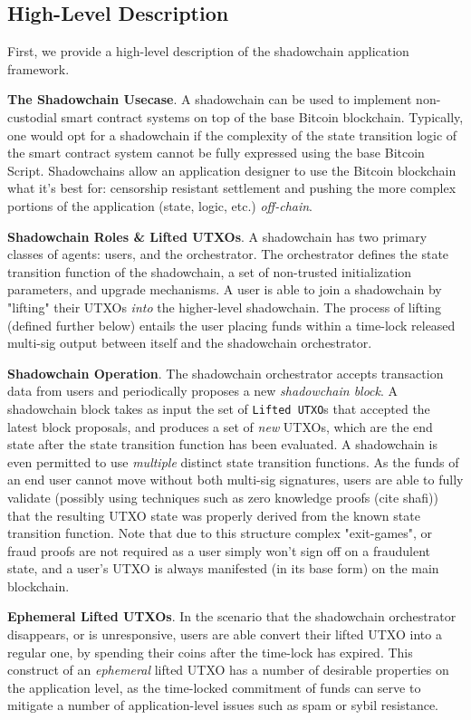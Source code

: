 \documentclass[10pt,a4paper]{article}
\theoremstyle{definition}
\begin{document}
\subsection{High-Level Description}

First, we provide a high-level description of the shadowchain application
framework.

\textbf{The Shadowchain Usecase}. A shadowchain can be used to implement
non-custodial smart contract systems on top of the base Bitcoin blockchain.
Typically, one would opt for a shadowchain if the complexity of the state
transition logic of the smart contract system cannot be fully expressed using
the base Bitcoin Script. Shadowchains allow an application designer to use the
Bitcoin blockchain what it's best for: censorship resistant settlement and
pushing the more complex portions of the application (state, logic, etc.)
\emph{off-chain}.

\textbf{Shadowchain Roles \& Lifted UTXOs}. A shadowchain has two primary
classes of agents: users, and the orchestrator.  The orchestrator defines the
state transition function of the shadowchain, a set of non-trusted
initialization parameters, and upgrade mechanisms. A user is able to join a
shadowchain by "lifting" their UTXOs \emph{into} the higher-level shadowchain.
The process of lifting (defined further below) entails the user placing funds
within a time-lock released multi-sig output between itself and the shadowchain
orchestrator.

\textbf{Shadowchain Operation}. The shadowchain orchestrator accepts
transaction data from users and periodically proposes a new \emph{shadowchain
block}. A shadowchain block takes as input the set of \texttt{Lifted UTXO}s
that accepted the latest block proposals, and produces a set of \emph{new}
UTXOs, which are the end state after the state transition function has been
evaluated. A shadowchain is even permitted to use \emph{multiple} distinct state
transition functions. As the funds of an end user cannot move without both
multi-sig signatures, users are able to fully validate (possibly using
techniques such as zero knowledge proofs (cite shafi)) that the
resulting UTXO state was properly derived from the known state transition
function.  Note that due to this structure complex "exit-games", or fraud
proofs are not required as a user simply won't sign off on a fraudulent state,
and a user's UTXO is always manifested (in its base form) on the main blockchain.

\textbf{Ephemeral Lifted UTXOs}. In the scenario that the shadowchain orchestrator
disappears, or is unresponsive, users are able convert their lifted UTXO into a
regular one, by spending their coins after the time-lock has expired. This
construct of an \emph{ephemeral} lifted UTXO has a number of desirable properties
on the application level, as the time-locked commitment of funds can serve
to mitigate a number of application-level issues such as spam or sybil
resistance.
\end{document}
